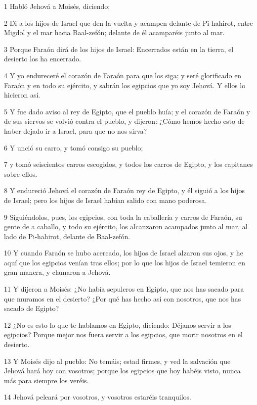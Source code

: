 \par 1 Habló Jehová a Moisés, diciendo:
\par 2 Di a los hijos de Israel que den la vuelta y acampen delante de Pi-hahirot, entre Migdol y el mar hacia Baal-zefón; delante de él acamparéis junto al mar.
\par 3 Porque Faraón dirá de los hijos de Israel: Encerrados están en la tierra, el desierto los ha encerrado.
\par 4 Y yo endureceré el corazón de Faraón para que los siga; y seré glorificado en Faraón y en todo su ejército, y sabrán los egipcios que yo soy Jehová. Y ellos lo hicieron así.
\par 5 Y fue dado aviso al rey de Egipto, que el pueblo huía; y el corazón de Faraón y de sus siervos se volvió contra el pueblo, y dijeron: ¿Cómo hemos hecho esto de haber dejado ir a Israel, para que no nos sirva?
\par 6 Y unció su carro, y tomó consigo su pueblo;
\par 7 y tomó seiscientos carros escogidos, y todos los carros de Egipto, y los capitanes sobre ellos.
\par 8 Y endureció Jehová el corazón de Faraón rey de Egipto, y él siguió a los hijos de Israel; pero los hijos de Israel habían salido con mano poderosa.
\par 9 Siguiéndolos, pues, los egipcios, con toda la caballería y carros de Faraón, su gente de a caballo, y todo su ejército, los alcanzaron acampados junto al mar, al lado de Pi-hahirot, delante de Baal-zefón.
\par 10 Y cuando Faraón se hubo acercado, los hijos de Israel alzaron sus ojos, y he aquí que los egipcios venían tras ellos; por lo que los hijos de Israel temieron en gran manera, y clamaron a Jehová.
\par 11 Y dijeron a Moisés: ¿No había sepulcros en Egipto, que nos has sacado para que muramos en el desierto? ¿Por qué has hecho así con nosotros, que nos has sacado de Egipto?
\par 12 ¿No es esto lo que te hablamos en Egipto, diciendo: Déjanos servir a los egipcios? Porque mejor nos fuera servir a los egipcios, que morir nosotros en el desierto.
\par 13 Y Moisés dijo al pueblo: No temáis; estad firmes, y ved la salvación que Jehová hará hoy con vosotros; porque los egipcios que hoy habéis visto, nunca más para siempre los veréis.
\par 14 Jehová peleará por vosotros, y vosotros estaréis tranquilos.
